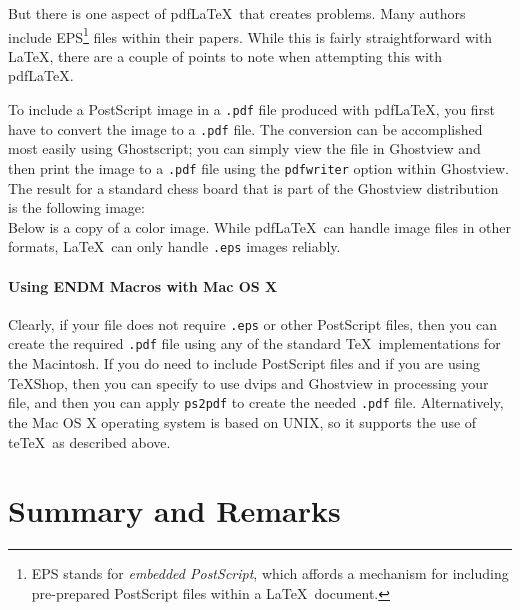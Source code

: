 \documentclass{endm}
\begin{document}
But there is one aspect of pdf\LaTeX\ that creates problems. Many
authors include EPS\footnote{EPS stands for \emph{embedded PostScript},
which affords a mechanism for including pre-prepared PostScript files
within a \LaTeX\ document.} files within their papers. While this is
fairly straightforward with \LaTeX, there are a couple of points to
note when attempting this with pdf\LaTeX.

To include a PostScript image in a \texttt{.pdf} file produced with
pdf\LaTeX, you first have to convert the image to a \texttt{.pdf} file.
The conversion can be accomplished most easily using Ghostscript; you
can simply view the file in Ghostview and then print the image to a
\texttt{.pdf} file using the \verb+pdfwriter+ option within Ghostview.
The result for a standard chess board that is part of the Ghostview
distribution is the following image:\\


Below is a copy of a color image. While pdf\LaTeX\ can handle image
files in other formats, \LaTeX\ can only handle \texttt{.eps} images
reliably.\\


\paragraph{Using ENDM Macros with Mac OS X}

Clearly, if your file does not require \texttt{.eps} or other
PostScript files, then you can create the required \texttt{.pdf} file
using any of the standard \TeX\ implementations for the Macintosh. If
you do need to include PostScript files and if you are using \TeX Shop,
then you can specify to use dvips and Ghostview in processing your
file, and then you can apply \texttt{ps2pdf} to create the needed
\texttt{.pdf} file. Alternatively, the Mac OS X operating system is
based on UNIX, so it supports the use of te\TeX\ as described above.


\section{Summary and Remarks}
\end{document}
